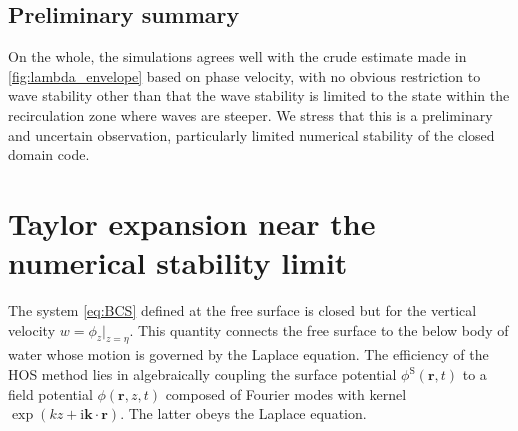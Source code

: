 \documentclass[a4paper,12pt]{article}
\newcommand{\mr}{\mathrm}
\renewcommand{\S}{^\mr{S}}
\newcommand{\ii}{\mr{i}}
\renewcommand{\_}[1]{_\mr{#1}}
\newcommand{\rr}{\bm r}%
\newcommand{\w}{w}
\begin{document}
\subsection{Preliminary summary}
On the whole, the simulations agrees well with the crude estimate made in \autoref{fig:lambda_envelope} based on phase velocity, with no obvious restriction to wave stability other than that the wave stability is limited to the state within the recirculation zone where waves are steeper. 
We stress that this is a preliminary and uncertain observation, particularly limited numerical stability of the closed domain code.





\appendix


\section{Taylor expansion near the numerical stability limit}
\label{sec:Taylor}
The system \eqref{eq:BCS} defined at the free surface is closed but for the vertical velocity $\w=\phi_z\big|_{z=\eta}$. This quantity connects the free surface to the below body of water whose motion is governed by the Laplace equation.
The efficiency of the HOS method lies in algebraically coupling the surface potential $\phi\S(\rr,t)$ to a field potential $\phi(\rr,z,t)$ composed of Fourier modes with kernel $\exp(kz +\ii \bm k \cdot \bm r)$. The latter obeys the Laplace equation.
\end{document}
